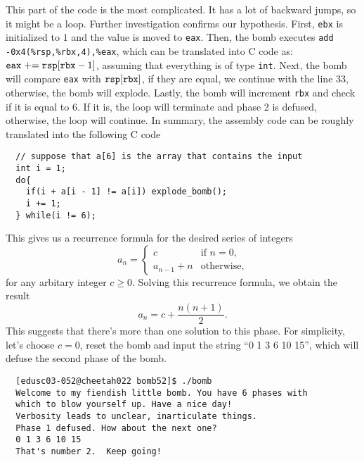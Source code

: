 This part of the code is the most complicated. It has a lot of backward jumps, so it might be a loop. Further investigation confirms our hypothesis. First, \verb+ebx+ is initialized to $1$ and the value is moved to \verb+eax+. Then, the bomb executes \verb+add -0x4(%rsp,%rbx,4),%eax+, which can be translated into C code as: $\verb+eax+ \mathrel{+}= \verb+rsp+[\verb+rbx+ - 1]$, assuming that everything is of type \verb+int+. Next, the bomb will compare \verb+eax+ with $\verb+rsp+[\verb+rbx+]$, if they are equal, we continue with the line 33, otherwise, the bomb will explode. Lastly, the bomb will increment \verb+rbx+ and check if it is equal to $6$. If it is, the loop will terminate and phase 2 is defused, otherwise, the loop will continue. In summary, the assembly code can be roughly translated into the following C code
\begin{verbatim}
  // suppose that a[6] is the array that contains the input
  int i = 1;
  do{
    if(i + a[i - 1] != a[i]) explode_bomb();
    i += 1;
  } while(i != 6);
\end{verbatim}
This gives us a recurrence formula for the desired series of integers
$$ a_n = \begin{cases}
  c & \text{if }n = 0,\\
  a_{n - 1} + n & \text{otherwise},
\end{cases} $$
for any arbitary integer $c \geq 0$. Solving this recurrence formula, we obtain the result
$$ a_n = c + \dfrac{n(n + 1)}{2}. $$
This suggests that there's more than one solution to this phase. For simplicity, let's choose $c = 0$, reset the bomb and input the string ``0 1 3 6 10 15'', which will defuse the second phase of the bomb.
{\renewcommand\fcolorbox[4][]{\textcolor{black}{\strut#4}}
\begin{verbatim}
  [edusc03-052@cheetah022 bomb52]$ ./bomb
  Welcome to my fiendish little bomb. You have 6 phases with
  which to blow yourself up. Have a nice day!
  Verbosity leads to unclear, inarticulate things.
  Phase 1 defused. How about the next one?
  0 1 3 6 10 15
  That's number 2.  Keep going!
\end{verbatim}
}

\newpage